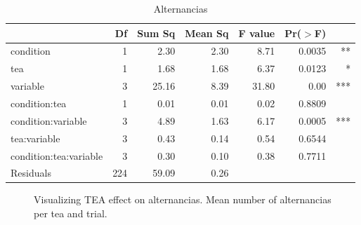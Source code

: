 \documentclass{article}
\begin{document}
\begin{table}[H]
\centering
\caption{Alternancias}
\begin{tabular}{lrrrrrr}
  \hline
 & Df & Sum Sq & Mean Sq & F value & Pr($>$F) & \\ 
  \hline
  condition              & 1 & 2.30 & 2.30 & 8.71 & 0.0035 & **\\ 
  tea                    & 1 & 1.68 & 1.68 & 6.37 & 0.0123 & *\\ 
  variable               & 3 & 25.16 & 8.39 & 31.80 & 0.00 & ***\\ 
  condition:tea          & 1 & 0.01 & 0.01 & 0.02 & 0.8809 & \\ 
  condition:variable     & 3 & 4.89 & 1.63 & 6.17 & 0.0005 & ***\\ 
  tea:variable           & 3 & 0.43 & 0.14 & 0.54 & 0.6544 & \\ 
  condition:tea:variable & 3 & 0.30 & 0.10 & 0.38 & 0.7711 & \\ 
  Residuals              & 224 & 59.09 & 0.26 &  &  & \\ 
   \hline
\end{tabular}
\end{table}


\begin{figure}[H]
  \caption{Visualizing TEA effect on alternancias. Mean number of alternancias per tea and trial.}
  \noindent{}
  \centering
\end{figure}
\end{document}
